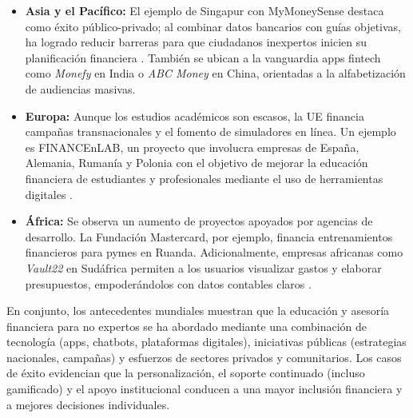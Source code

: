 \begin{itemize}
	\item \textbf{Asia y el Pacífico:} El ejemplo de Singapur con MyMoneySense destaca como éxito público-privado; al combinar datos bancarios con guías objetivas, ha logrado reducir barreras para que ciudadanos inexpertos inicien su planificación financiera \parencite{MoneySense01}. También se ubican a la vanguardia apps fintech como \textit{Monefy} en India o \textit{ABC Money} en China, orientadas a la alfabetización de audiencias masivas.
	
	\item \textbf{Europa:} Aunque los estudios académicos son escasos, la UE financia campañas transnacionales y el fomento de simuladores en línea. Un ejemplo es FINANCEnLAB, un proyecto que involucra empresas de España, Alemania, Rumanía y Polonia con el objetivo de mejorar la educación financiera de estudiantes y profesionales mediante el uso de herramientas digitales \parencite{UniversidadValladolid01}.
	
	\item \textbf{África:} Se observa un aumento de proyectos apoyados por agencias de desarrollo. La Fundación Mastercard, por ejemplo, financia entrenamientos financieros para pymes en Ruanda. Adicionalmente, empresas africanas como \textit{Vault22} en Sudáfrica permiten a los usuarios visualizar gastos y elaborar presupuestos, empoderándolos con datos contables claros \parencite{Vault01}.
\end{itemize}

En conjunto, los antecedentes mundiales muestran que la educación y asesoría financiera para no expertos se ha abordado mediante una combinación de tecnología (apps, chatbots, plataformas digitales), iniciativas públicas (estrategias nacionales, campañas) y esfuerzos de sectores privados y comunitarios. Los casos de éxito evidencian que la personalización, el soporte continuado (incluso gamificado) y el apoyo institucional conducen a una mayor inclusión financiera y a mejores decisiones individuales.

